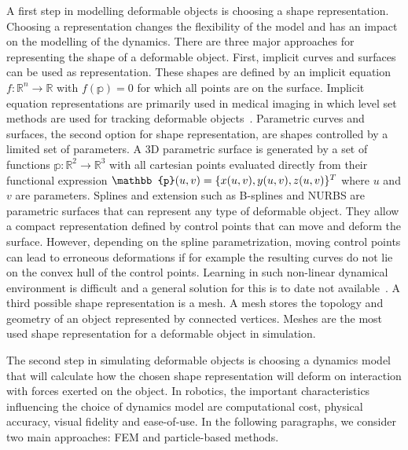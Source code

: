 \documentclass[\home/main.tex]{subfiles}
\begin{document}
A first step in modelling deformable objects is choosing a shape representation. Choosing a representation changes the flexibility of the model and has an impact on the modelling of the dynamics. There are three major approaches for representing the shape of a deformable object. First, implicit curves and surfaces can be used as representation. These shapes are defined by an implicit equation $f: \mathbb{R}^{n} \rightarrow \mathbb{R}$ with $f(\mathbb{p}) = 0$ for which all points are on the surface. Implicit equation representations are primarily used in medical imaging in which level set methods are used for tracking deformable objects~\autocite{Cremers2006}. Parametric curves and surfaces, the second option for shape representation, are shapes controlled by a limited set of parameters. A 3D parametric surface is generated by a set of functions $\mathbb{p}: \mathbb{R}^{2} \rightarrow \mathbb{R}^{3}$ with all cartesian points evaluated directly from their functional expression $\mathbb{p}(u, v) =\\ \{x(u, v), y(u, v), z(u, v)\}^{T}$ where $u$ and $v$ are parameters. Splines and extension such as B-splines and NURBS are parametric surfaces that can represent any type of deformable object. They allow a compact representation defined by control points that can move and deform the surface. However, depending on the spline parametrization, moving control points can lead to erroneous deformations if for example the resulting curves do not lie on the convex hull of the control points. Learning in such non-linear dynamical environment is difficult and a general solution for this is to date not available~\autocite{rios2020}. A third possible shape representation is a mesh. A mesh stores the topology and geometry of an object represented by connected vertices. Meshes are the most used shape representation for a deformable object in simulation. 

The second step in simulating deformable objects is choosing a dynamics model that will calculate how the chosen shape representation will deform on interaction with forces exerted on the object. In robotics, the important characteristics influencing the choice of dynamics model are computational cost, physical accuracy, visual fidelity and ease-of-use. In the following paragraphs, we consider two main approaches: \gls{FEM} and particle-based methods.
\end{document}

